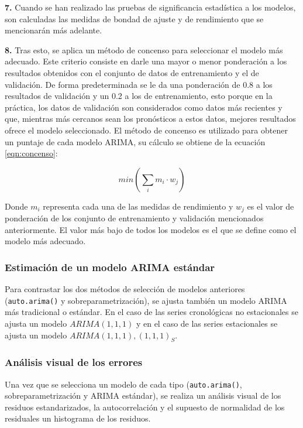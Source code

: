 \documentclass[
]{article}
\begin{document}
\textbf{7.} Cuando se han realizado las pruebas de significancia
estadística a los modelos, son calculadas las medidas de bondad de
ajuste y de rendimiento que se mencionarán más adelante.

\textbf{8.} Tras esto, se aplica un método de concenso para seleccionar
el modelo más adecuado. Este criterio consiste en darle una mayor o
menor ponderación a los resultados obtenidos con el conjunto de datos de
entrenamiento y el de validación. De forma predeterminada se le da una
ponderación de 0.8 a los resultados de validación y un 0.2 a los de
entrenamiento, esto porque en la práctica, los datos de validación son
considerados como datos más recientes y que, mientras más cercanos sean
los pronósticos a estos datos, mejores resultados ofrece el modelo
seleccionado. El método de concenso es utilizado para obtener un puntaje
de cada modelo ARIMA, su cálculo se obtiene de la ecuación
\ref{eqn:concenso}:

\begin{equation}
\label{eqn:concenso}
min\left( \sum_i {m_i}\cdot w_j \right)
\end{equation}

Donde \(m_i\) representa cada una de las medidas de rendimiento y
\(w_j\) es el valor de ponderación de los conjunto de entrenamiento y
validación mencionados anteriormente. El valor más bajo de todos los
modelos es el que se define como el modelo más adecuado.

\subsubsection{Estimación de un modelo ARIMA estándar}

Para contrastar los dos métodos de selección de modelos anteriores
(\texttt{auto.arima()} y sobreparametrización), se ajusta también un
modelo ARIMA más tradicional o estándar. En el caso de las series
cronológicas no estacionales se ajusta un modelo \(ARIMA(1,1,1)\) y en
el caso de las series estacionales se ajusta un modelo
\(ARIMA(1,1,1),(1,1,1)_S\).

\subsubsection{Análisis visual de los errores}

Una vez que se selecciona un modelo de cada tipo (\texttt{auto.arima()},
sobreparametrización y ARIMA estándar), se realiza un análisis visual de
los residuos estandarizados, la autocorrelación y el supuesto de
normalidad de los residuales un histograma de los residuos.
\end{document}
